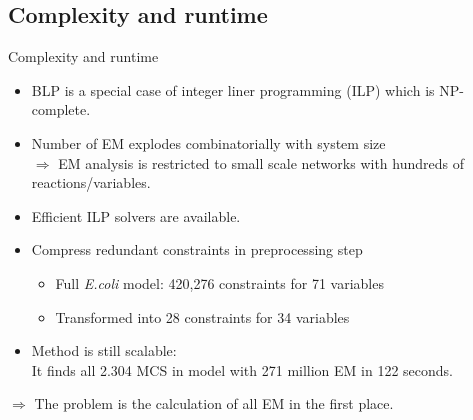 \documentclass{beamer}
\begin{document}
\subsection{Complexity and runtime}

\begin{frame}{Complexity and runtime}
\begin{itemize}
	\item BLP is a special case of integer liner programming (ILP) which is NP-complete. 
	\item Number of EM explodes combinatorially with system size \\
	 $\Rightarrow$ EM analysis is restricted to 
	small scale networks with hundreds of reactions/variables.
\pause	
    \item Efficient ILP solvers are available. 
    \item Compress redundant constraints in preprocessing step 
	\begin{itemize}
		\item Full \emph{E.coli} model: 420,276 constraints for 71 variables
		\item Transformed into 28 constraints for 34 variables
	\end{itemize}
	\item Method is still scalable: \\
	It finds all 2.304 MCS in model with 271 million EM in 122 seconds. 
\end{itemize}
$\Rightarrow$ The problem is the calculation of all EM in the first place.
\end{frame}
\end{document}
